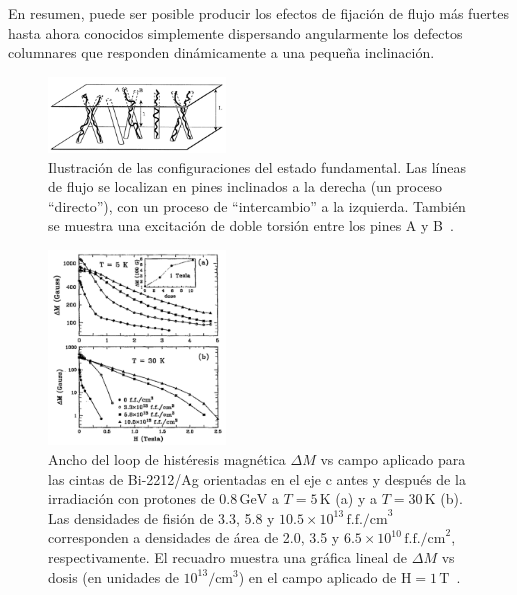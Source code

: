 \documentclass[a4paper,conference]{IEEEtran}
\begin{document}
En resumen, puede ser posible producir los efectos de fijaci\'{o}n de flujo
m\'{a}s fuertes hasta ahora conocidos simplemente dispersando angularmente los
defectos columnares que responden din\'{a}micamente a una peque\~{n}a
inclinaci\'{o}n.

\begin{figure}[!ht]
				\centering 
				\includegraphics[width=0.42\textwidth]{splay_de_vortices} 
				\caption{Ilustraci\'{o}n de las configuraciones del estado fundamental. Las
				l\'{i}neas de flujo se localizan en pines inclinados a la derecha (un
				proceso ``directo''), con un proceso de ``intercambio'' a la izquierda.
				Tambi\'{e}n se muestra una excitaci\'{o}n de doble torsi\'{o}n entre los
				pines A y B~\cite{Hwa1994}.
				} 
				\label{fig:splay_de_vortices}
\end{figure}

\begin{figure}[!ht]
				\centering 
				\includegraphics[width=0.42\textwidth]{splay2}
				\caption{
								Ancho del loop de hist\'{e}resis magn\'{e}tica $\Delta M$ vs campo aplicado
								para las cintas de Bi-2212/Ag orientadas en el eje c antes y despu\'{e}s
								de la irradiaci\'{o}n con protones de $0.8\,\text{GeV}$ a $T =
								5\,\text{K}$ (a) y a $T = 30\,\text{K}$ (b). Las densidades de
								fisi\'{o}n de 3.3, 5.8 y $10.5\times10^{13}\,\text{f.f./cm}^3$
								corresponden a densidades de \'{a}rea de 2.0, 3.5 y
								$6.5\times10^{10}\,\text{f.f./cm}^2$, respectivamente. El
								recuadro muestra una gr\'{a}fica lineal de $\Delta M$ vs dosis
								(en unidades de $10^{13}/\text{cm}^3$) en el campo aplicado de
								$\text{H} =
								1\,\text{T}$~\cite{Krusin-Elbaum1994}.
				} 
				\label{fig:splay2}
\end{figure}
\end{document}
